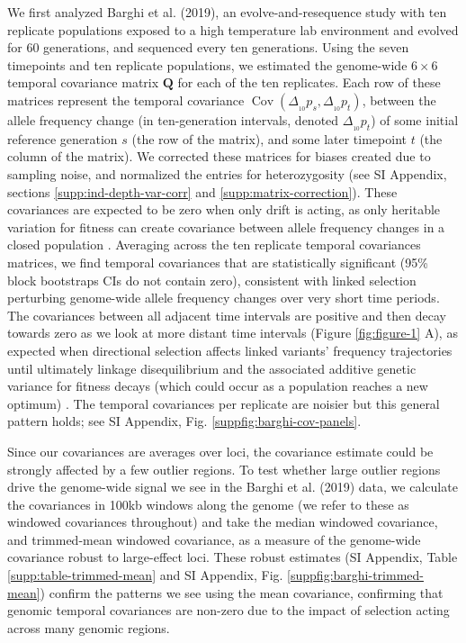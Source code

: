 \documentclass[9pt,twocolumn,twoside]{pnas-new}
\DeclareMathOperator{\cov}{Cov}
\begin{document}
We first analyzed Barghi et al. (2019), an evolve-and-resequence study with ten
replicate populations exposed to a high temperature lab environment and evolved
for 60 generations, and sequenced every ten generations. Using the seven
timepoints and ten replicate populations, we estimated the genome-wide $6
\times 6$ temporal covariance matrix $\mathbf{Q}$ for each of the ten
replicates. Each row of these matrices represent the temporal covariance
$\cov(\Delta_{_{10}} p_s, \Delta_{_{10}} p_t)$, between the allele frequency
change (in ten-generation intervals, denoted $\Delta_{_{10}} p_t$) of some
initial reference generation $s$ (the row of the matrix), and some later
timepoint $t$ (the column of the matrix). We corrected these matrices for
biases created due to sampling noise, and normalized the entries for
heterozygosity (see SI Appendix, sections
\ref{supp:ind-depth-var-corr} and \ref{supp:matrix-correction}). These
covariances are expected to be zero when only drift is acting, as only
heritable variation for fitness can create covariance between allele frequency
changes in a closed population \cite{Buffalo2019-io}.  Averaging across the ten
replicate temporal covariances matrices, we find temporal covariances that are
statistically significant (95\% block bootstraps CIs do not contain zero),
consistent with linked selection perturbing genome-wide allele frequency
changes over very short time periods. The covariances between all adjacent time
intervals are positive and then decay towards zero as we look at more distant
time intervals (Figure \ref{fig:figure-1} A), as expected when directional
selection affects linked variants' frequency trajectories until ultimately
linkage disequilibrium and the associated additive genetic variance for fitness
decays (which could occur as a population reaches a new optimum)
\cite{Buffalo2019-io}. The temporal covariances per replicate are noisier but
this general pattern holds; see SI Appendix, Fig. 
\ref{suppfig:barghi-cov-panels}. 

Since our covariances are averages over loci, the covariance estimate could be
strongly affected by a few outlier regions. To test whether large outlier
regions drive the genome-wide signal we see in the Barghi et al. (2019)
data, we calculate the covariances in 100kb windows along the genome (we refer
to these as windowed covariances throughout) and take the median windowed
covariance, and trimmed-mean windowed covariance, as a measure of the
genome-wide covariance robust to large-effect loci. These robust estimates
(SI Appendix, Table \ref{supp:table-trimmed-mean} and SI Appendix, Fig.
\ref{suppfig:barghi-trimmed-mean}) confirm the patterns we see using the mean
covariance, confirming that genomic temporal covariances are non-zero due to
the impact of selection acting across many genomic regions. 
\end{document}
